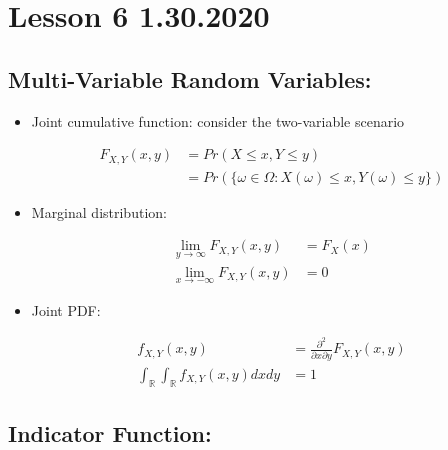 \documentclass[11pt,letterpaper,titlepage]{article}
\begin{document}
\newpage

\section{Lesson 6 1.30.2020}

\subsection{Multi-Variable Random Variables:}

\begin{itemize}

    \item Joint cumulative function: consider the two-variable scenario
    
    \begin{equation*}
        \begin{aligned}
            F_{X, Y}(x, y) &= Pr(X \leq x, Y \leq y) \\
            &= Pr(\{\omega \in \Omega: X(\omega) \leq x, Y(\omega) \leq y\})
        \end{aligned}
    \end{equation*}
    
    \item Marginal distribution: 
    
    \begin{equation*}
        \begin{aligned}
            \lim_{y \to \infty} F_{X, Y} (x, y) &= F_X(x) \\
            \lim_{x \to -\infty} F_{X, Y} (x, y) &= 0
        \end{aligned}
    \end{equation*}
    
    \item Joint PDF:
    
    \begin{equation*}
        \begin{aligned}
            f_{X, Y}(x, y) &= \frac{\partial^2}{\partial x \partial y} F_{X, Y}(x, y) \\
            \int_\mathbb{R} \int_\mathbb{R} f_{X, Y}(x, y) dx dy &= 1
        \end{aligned}
    \end{equation*}
    
\end{itemize}

\subsection{Indicator Function:}
\end{document}

